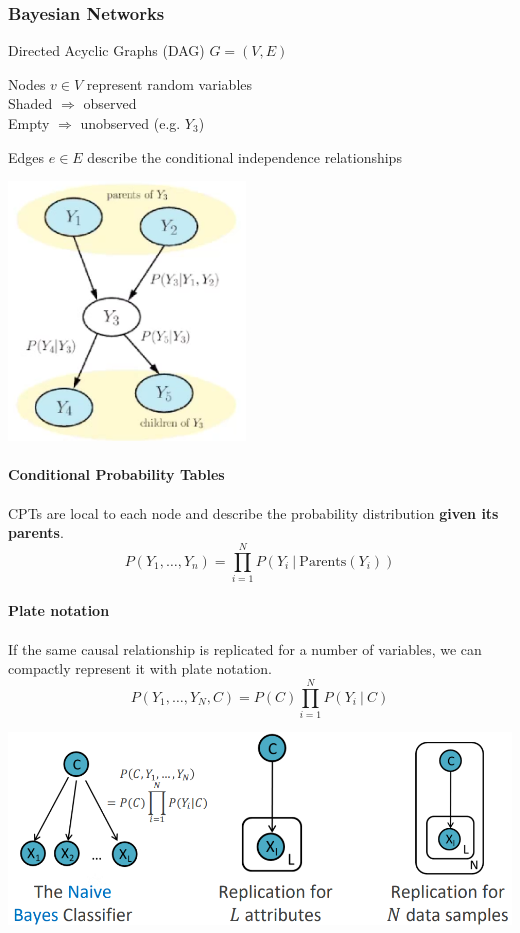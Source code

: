 \documentclass[10pt]{report}
\begin{document}
\subsubsection{Bayesian Networks} 
\begin{multicols}{2}
Directed Acyclic Graphs (DAG) $G = (V,E)$\begin{list}{}{}
	\item Nodes $v\in V$ represent random variables\\
	Shaded $\Rightarrow$ observed\\
	Empty $\Rightarrow$ unobserved (e.g. $Y_3$)
	\item Edges $e\in E$ describe the conditional independence relationships
\end{list}
\columnbreak
\begin{center}
	\includegraphics[scale=0.5]{15.png}
\end{center}
\end{multicols}
\paragraph{Conditional Probability Tables} CPTs are local to each node and describe the probability distribution \textbf{given its parents}.
$$P(Y_1,\ldots,Y_n) = \prod_{i=1}^N P(Y_i\:|\:\text{Parents}(Y_i))$$
\paragraph{Plate notation} If the same causal relationship is replicated for a number of variables, we can compactly represent it with plate notation.
$$P(Y_1,\ldots,Y_N,C) = P(C)\prod_{i=1}^N P(Y_i\:|\:C)$$
\begin{center}
	\includegraphics[scale=0.5]{16.png}
\end{center}
\end{document}

